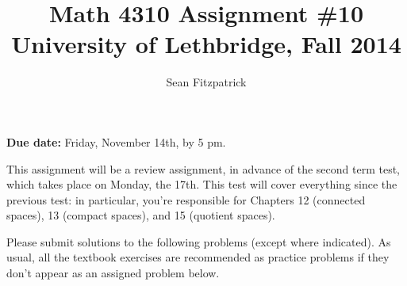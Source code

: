 \documentclass[letterpaper,12pt]{article}
\title{Math 4310 Assignment \#10\\University of Lethbridge, Fall 2014}
\author{Sean Fitzpatrick}
\begin{document}
 \maketitle

{\bf Due date:} Friday, November 14th, by 5 pm.

\bigskip

This assignment will be a review assignment, in advance of the second term test, which takes place on Monday, the 17th. This test will cover everything since the previous test: in particular, you're responsible for Chapters 12 (connected spaces), 13 (compact spaces), and 15 (quotient spaces).

Please submit solutions to the following problems (except where indicated). As usual, all the textbook exercises are recommended as practice problems if they don't appear as an assigned problem below.
\end{document}
